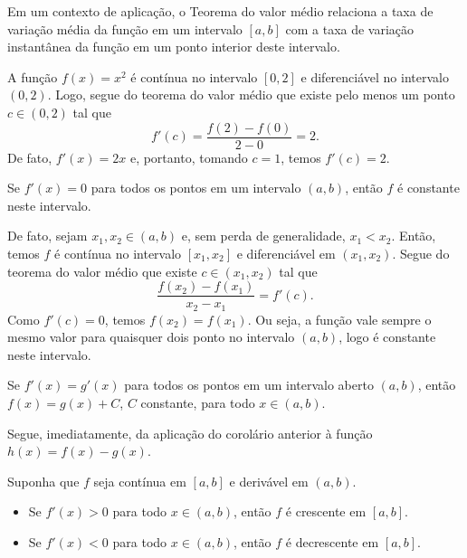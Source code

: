 \begin{obs}
  Em um contexto de aplicação, o Teorema do valor médio relaciona a taxa de variação média da função em um intervalo $[a, b]$ com a taxa de variação instantânea da função em um ponto interior deste intervalo.
\end{obs}

\begin{ex}
  A função $f(x)=x^2$ é contínua no intervalo $[0,2]$ e diferenciável no intervalo $(0,2)$. Logo, segue do teorema do valor médio que existe pelo menos um ponto $c\in (0,2)$ tal que
  \begin{equation}
    f'(c)=\frac{f(2)-f(0)}{2-0}=2.
  \end{equation}
  De fato, $f'(x)=2x$ e, portanto, tomando $c=1$, temos $f'(c)=2$.
\end{ex}

\begin{corol}
  Se $f'(x)=0$ para todos os pontos em um intervalo $(a, b)$, então $f$ é constante neste intervalo.
\end{corol}
\begin{dem}
  De fato, sejam $x_1,x_2\in (a, b)$ e, sem perda de generalidade, $x_1<x_2$. Então, temos $f$ é contínua no intervalo $[x_1,x_2]$ e diferenciável em $(x_1,x_2)$. Segue do teorema do valor médio que existe $c\in (x_1,x_2)$ tal que
  \begin{equation}
    \frac{f(x_2)-f(x_1)}{x_2-x_1}=f'(c).
  \end{equation}
  Como $f'(c)=0$, temos $f(x_2)=f(x_1)$. Ou seja, a função vale sempre o mesmo valor para quaisquer dois ponto no intervalo $(a, b)$, logo é constante neste intervalo.
\end{dem}

\begin{corol}\label{corol:apderiv_teomed_2}
  Se $f'(x)=g'(x)$ para todos os pontos em um intervalo aberto $(a,b)$, então $f(x)=g(x)+C$, $C$ constante, para todo $x\in (a,b)$.
\end{corol}
\begin{dem}
  Segue, imediatamente, da aplicação do corolário anterior à função $h(x)=f(x)-g(x)$.
\end{dem}

\begin{corol}\label{corol:mono_deriv}
  Suponha que $f$ seja contínua em $[a,b]$ e derivável em $(a,b)$.
  \begin{itemize}
  \item Se $f'(x)>0$ para todo $x\in (a,b)$, então $f$ é crescente em $[a,b]$.
  \item Se $f'(x)<0$ para todo $x\in (a,b)$, então $f$ é decrescente em $[a,b]$.
  \end{itemize}
\end{corol}

